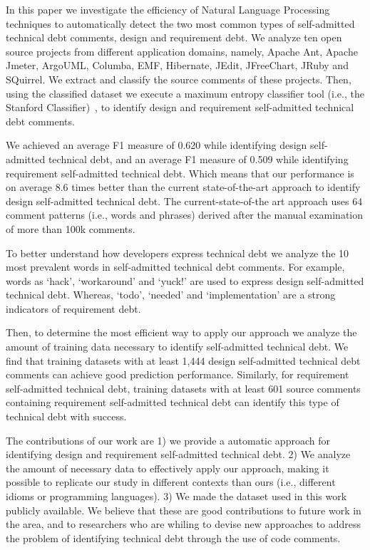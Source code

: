 \documentclass{sig-alternate}
\newcommand{\SATD}{self-admitted technical debt\xspace}
\begin{document}
In this paper we investigate the efficiency of Natural Language Processing techniques to automatically detect the two most common types of \SATD comments, design and requirement debt. We analyze ten open source projects from different application domains, namely, Apache Ant, Apache Jmeter, ArgoUML, Columba, EMF, Hibernate, JEdit, JFreeChart, JRuby and SQuirrel. We extract and classify the source comments of these projects. Then, using the classified dataset we execute a maximum entropy classifier tool (i.e., the Stanford Classifier)~\cite{Manning2014ACL}, to identify design and requirement \SATD comments.

We achieved an average F1 measure of 0.620 while identifying design \SATD, and an average F1 measure of 0.509 while identifying requirement \SATD. Which means that our performance is on average 8.6 times better than the current state-of-the-art approach to identify design \SATD. The current-state-of-the art approach uses 64 comment patterns (i.e., words and phrases) derived after the manual examination of more than 100k comments.


To better understand how developers express technical debt we analyze the 10 most prevalent words in \SATD comments. For example, words as `hack', `workaround' and `yuck!' are used to express design \SATD. Whereas, `todo', `needed' and `implementation' are a strong indicators of requirement debt.

Then, to determine the most efficient way to apply our approach we analyze the amount of training data necessary to identify \SATD. We find that training datasets with at least 1,444 design \SATD comments can achieve good prediction performance. Similarly, for requirement \SATD, training datasets with at least 601 source comments containing requirement \SATD can identify this type of technical debt with success.  

The contributions of our work are 1) we provide a automatic approach for identifying design and requirement \SATD. 2) We analyze the amount of necessary data to effectively apply our approach, making it possible to replicate our study in different contexts than ours (i.e., different idioms or programming languages). 3) We made the dataset used in this work publicly available. We believe that these are good contributions to future work in the area, and to researchers who are whiling to devise new approaches to address the problem of identifying technical debt through the use of code comments.
\end{document}
